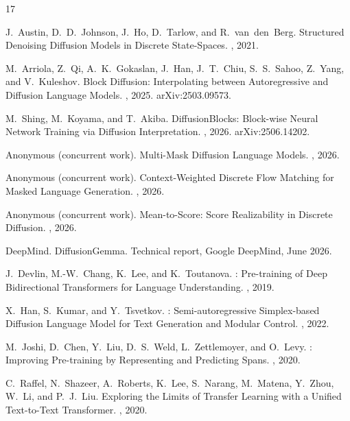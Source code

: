 \documentclass{article}
\begin{document}

\begin{thebibliography}{17}

J.~Austin, D.~D.~Johnson, J.~Ho, D.~Tarlow, and R.~van~den~Berg.
\newblock Structured Denoising Diffusion Models in Discrete State-Spaces.
, 2021.

M.~Arriola, Z.~Qi, A.~K.~Gokaslan, J.~Han, J.~T.~Chiu, S.~S.~Sahoo, Z.~Yang, and
V.~Kuleshov.
\newblock Block Diffusion: Interpolating between Autoregressive and Diffusion Language
Models.
, 2025. arXiv:2503.09573.

M.~Shing, M.~Koyama, and T.~Akiba.
\newblock DiffusionBlocks: Block-wise Neural Network Training via Diffusion
Interpretation.
, 2026. arXiv:2506.14202.

Anonymous (concurrent work).
\newblock Multi-Mask Diffusion Language Models.
, 2026.

Anonymous (concurrent work).
\newblock Context-Weighted Discrete Flow Matching for Masked Language Generation.
, 2026.

Anonymous (concurrent work).
\newblock Mean-to-Score: Score Realizability in Discrete Diffusion.
, 2026.

DeepMind.
\newblock DiffusionGemma.
\newblock Technical report, Google DeepMind, June 2026.

J.~Devlin, M.-W.~Chang, K.~Lee, and K.~Toutanova.
: Pre-training of Deep Bidirectional Transformers for Language
Understanding.
, 2019.

X.~Han, S.~Kumar, and Y.~Tsvetkov.
: Semi-autoregressive Simplex-based Diffusion Language Model for Text
Generation and Modular Control.
, 2022.

M.~Joshi, D.~Chen, Y.~Liu, D.~S.~Weld, L.~Zettlemoyer, and O.~Levy.
: Improving Pre-training by Representing and Predicting Spans.
, 2020.

C.~Raffel, N.~Shazeer, A.~Roberts, K.~Lee, S.~Narang, M.~Matena, Y.~Zhou, W.~Li, and
P.~J.~Liu.
\newblock Exploring the Limits of Transfer Learning with a Unified Text-to-Text
Transformer.
, 2020.


\end{thebibliography}
\end{document}
